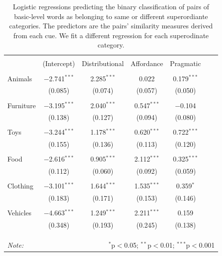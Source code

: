 \documentclass[english,,man,floatsintext]{apa6}
\begin{document}
\begin{table}[!htbp] \centering 
\caption{\label{tab:regressions} Logistic regressions predicting the binary classification of pairs of basic-level words as belonging to same or different superordiante categories. The predictors are the pairs' similarity measures derived from each cue. We fit a different regression for each superodinate category.} 
\label{} 
\begin{tabular}{@{\extracolsep{5pt}}lcccccc} 
\hline 
 & \multicolumn{4}{c}{} \\
 & (Intercept) & Distributional & Affordance & Pragmatic \\ 
\hline \\[-1.8ex] 
  Animals & $-$2.741$^{***}$ & 2.285$^{***}$ & 0.022 & 0.179$^{***}$\\
  & (0.085) & (0.074) & (0.057) & (0.050)\\
  & & & & & & \\
  Furniture & $-$3.195$^{***}$ & 2.040$^{***}$ & 0.547$^{***}$ & $-$0.104\\
  & (0.138) & (0.127) & (0.094) & (0.080) &\\
  & & & & & & \\
  Toys & $-$3.244$^{***}$ & 1.178$^{***}$ &  0.620$^{***}$ & 0.722$^{***}$\\
  & (0.155) & (0.136) & (0.113) & (0.120) &\\
  & & & & & & \\
  Food & $-$2.616$^{***}$ & 0.905$^{***}$ & 2.112$^{***}$ & 0.325$^{***}$\\
  & (0.112) & (0.060) & (0.092) & (0.059)\\
  & & & & & & \\
  Clothing & $-$3.101$^{***}$ & 1.644$^{***}$ & 1.535$^{***}$ & 0.359$^{*}$\\
  & (0.183) & (0.171) & (0.153) & (0.146)\\
  & & & & & & \\
  Vehicles & $-$4.663$^{***}$ & 1.249$^{***}$ & 2.211$^{***}$ & 0.159\\
  & (0.348) & (0.193) & (0.245) & (0.138)\\
  & & & & & & \\
 \\[-1.8ex] 

\hline \\[-1.8ex] 
\textit{Note:}  & \multicolumn{6}{r}{$^{*}$p$<$0.05; $^{**}$p$<$0.01; $^{***}$p$<$0.001} \\ 
\end{tabular} 
\end{table}
\end{document}
